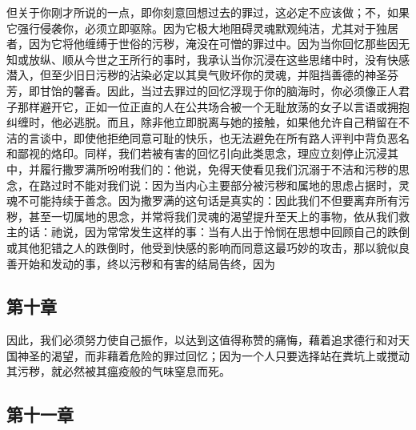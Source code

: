 但关于你刚才所说的一点，即你刻意回想过去的罪过，这必定不应该做；不，如果它强行侵袭你，必须立即驱除。因为它极大地阻碍灵魂默观纯洁，尤其对于独居者，因为它将他缠缚于世俗的污秽，淹没在可憎的罪过中。因为当你回忆那些因无知或放纵、顺从今世之王所行的事时，我承认当你沉浸在这些思绪中时，没有快感潜入，但至少旧日污秽的沾染必定以其臭气败坏你的灵魂，并阻挡善德的神圣芬芳，即甘饴的馨香。因此，当过去罪过的回忆浮现于你的脑海时，你必须像正人君子那样避开它，正如一位正直的人在公共场合被一个无耻放荡的女子以言语或拥抱纠缠时，他必逃脱。而且，除非他立即脱离与她的接触，如果他允许自己稍留在不洁的言谈中，即使他拒绝同意可耻的快乐，也无法避免在所有路人评判中背负恶名和鄙视的烙印。同样，我们若被有害的回忆引向此类思念，理应立刻停止沉浸其中，并履行撒罗满所吩咐我们的：他说，免得天使看见我们沉溺于不洁和污秽的思念，在路过时不能对我们说：因为当内心主要部分被污秽和属地的思虑占据时，灵魂不可能持续于善念。因为撒罗满的这句话是真实的：因此我们不但要离弃所有污秽，甚至一切属地的思念，并常将我们灵魂的渴望提升至天上的事物，依从我们救主的话：祂说，因为常常发生这样的事：当有人出于怜悯在思想中回顾自己的跌倒或其他犯错之人的跌倒时，他受到快感的影响而同意这最巧妙的攻击，那以貌似良善开始和发动的事，终以污秽和有害的结局告终，因为\par


\subsection{第十章}

\par

因此，我们必须努力使自己振作，以达到这值得称赞的痛悔，藉着追求德行和对天国神圣的渴望，而非藉着危险的罪过回忆；因为一个人只要选择站在粪坑上或搅动其污秽，就必然被其瘟疫般的气味窒息而死。\par


\subsection{第十一章}

